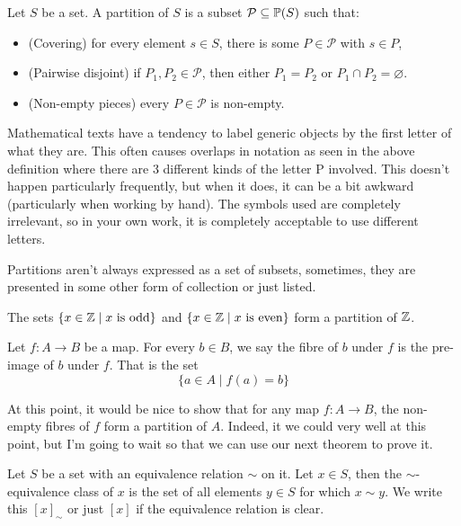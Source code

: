 \begin{definition}[Partitions]
    Let $S$ be a set. A partition of $S$ is a subset $\mathcal{P} \subseteq \mathbb{P}(S)$ such that:
    \begin{itemize}
        \item (Covering) for every element $s \in S$, there is some $P \in \mathcal{P}$ with $s \in P$,
        \item (Pairwise disjoint) if $P_1, P_2 \in \mathcal{P}$, then either $P_1 = P_2$ or $P_1 \cap P_2 = \varnothing$.
        \item (Non-empty pieces) every $P\in \mathcal{P}$ is non-empty.
    \end{itemize}
\end{definition}
\begin{remark}
    Mathematical texts have a tendency to label generic objects by the first letter of what they are. This often causes overlaps in notation as seen in the above definition where there are 3 different kinds of the letter P involved. 
    This doesn't happen particularly frequently, but when it does, it can be a bit awkward (particularly when working by hand). The symbols used are completely irrelevant, so in your own work, it is completely acceptable to use different letters.
\end{remark}
\begin{remark}
    Partitions aren't always expressed as a set of subsets, sometimes, they are presented in some other form of collection or just listed.
\end{remark}
\begin{example}
    The sets $\{ x \in \mathbb{Z} \mid \text{$x$ is odd} \}$ and $\{ x \in \mathbb{Z} \mid \text{$x$ is even} \}$ form a partition of $\mathbb{Z}$.
\end{example}
\begin{definition}
    Let $f \colon A \to B$ be a map. For every $b \in B$, we say the fibre of $b$ under $f$ is the pre-image of $b$ under $f$. That is the set
    \begin{equation*}
        \{ a \in A \mid f(a) = b \}
    \end{equation*}
\end{definition}
\begin{remark}
    At this point, it would be nice to show that for any map $f \colon A \to B$, the non-empty fibres of $f$ form a partition of $A$. Indeed, it we could very well at this point, but I'm going to wait so that we can use our next theorem to prove it.
\end{remark}
\begin{definition}
    Let $S$ be a set with an equivalence relation $\sim$ on it. Let $x \in S$, then the $\sim$-equivalence class of $x$ is the set of all elements $y \in S$ for which $x \sim y$. We write this $[x]_{\sim}$ or just $[x]$ if the equivalence relation is clear.
\end{definition}

